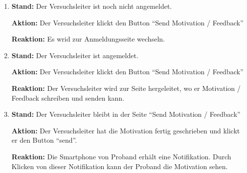 \documentclass[a4paper]{scrreprt}
\begin{document}
\begin{itemize}
                    \begin{enumerate}
                        \item \par \textbf{Stand: } Der Versuchsleiter ist noch nicht angemeldet.
                              \par \textbf{Aktion: } Der Versuchsleiter klickt den Button ``Send Motivation / Feedback''
                              \par \textbf{Reaktion: } Es wrid zur Anmeldungsseite wechseln.
                        \item \par \textbf{Stand: } Der Versuchsleiter ist angemeldet.
                              \par \textbf{Aktion: }  Der Versuchsleiter klickt den Button ``Send Motivation / Feedback''
                              \par \textbf{Reaktion: } Der Versuchsleiter wird zur Seite hergeleitet, wo er Motivation / Feedback schreiben und senden kann.
                        \item \par \textbf{Stand: } Der Versuchsleiter bleibt in der Seite ``Send Motivation / Feedback''
                              \par \textbf{Aktion: } Der Versuchsleiter hat die Motivation fertig geschrieben und klickt er den Button ``send''.
                              \par \textbf{Reaktion: } Die Smartphone von Proband erh\"alt eine Notifikation. Durch Klicken von dieser Notifikation kann der Proband die Motivation sehen.
                    \end{enumerate}


\end{itemize}
\end{document}
